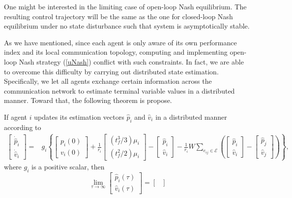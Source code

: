 \documentclass[12pt,draftcls,onecolumn]{IEEEtran}  %
\begin{document}
{\begin{Rmk}
One might be interested in the limiting case of open-loop Nash equilibrium. The resulting control trajectory will be the same as the one for closed-loop Nash equilibrium under no state disturbance such that system is asymptotically stable.
\end{Rmk}

As we have mentioned, since each agent is only aware of its own performance index and its local communication topology, computing and implementing open-loop Nash strategy (\ref{uNash}) conflict with such constraints. In fact, we are able to overcome this difficulty by carrying out distributed state estimation. Specifically, we let all agents exchange certain information across the communication network to estimate terminal variable values in a distributed manner. Toward that, the following theorem is propose.
\begin{thm}\label{Thm1}
If agent $i$ updates its estimation vectors $\hat{p}_i$ and $\hat{v}_i$ in a distributed manner according to
\begin{align}
\begin{bmatrix}
\dot{\hat{p}}_i\\
\dot{\hat{v}}_i
\end{bmatrix}=&g_i\left\{\begin{bmatrix}
p_i(0)\\
v_{i}(0)
\end{bmatrix}+\frac{1}{r_i}\begin{bmatrix}
(t_f^3/3)\mu_i\\
(t_f^2/2)\mu_i
\end{bmatrix}-\begin{bmatrix}
\hat{p}_i\\
\hat{v}_i
\end{bmatrix}-\frac{1}{r_i}W\sum_{e_{ij}\in\mathcal{E}}\left(\begin{bmatrix}
\hat{p}_i\\
\hat{v}_i
\end{bmatrix}-\begin{bmatrix}
\hat{p}_j\\
\hat{v}_j
\end{bmatrix}\right)\right\},\label{update}
\end{align}
where $g_i$ is a positive scalar, then
\begin{equation}
\lim_{\tau\rightarrow\infty}\begin{bmatrix}
\hat{p}_i(\tau)\\
\hat{v}_i(\tau)
\end{bmatrix}=\begin{bmatrix}

\end{bmatrix}
\end{equation}
\end{thm}}
\end{document}
